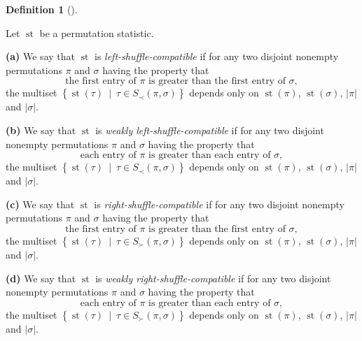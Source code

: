 \documentclass[numbers=enddot,12pt,final,onecolumn,notitlepage]{scrartcl}%
\theoremstyle{definition}
\newtheorem{defi}[theo]{Definition}
\newenvironment{definition}[1][]
{\begin{defi}[#1]\begin{leftbar}}
{\end{leftbar}\end{defi}}
\begin{document}
\begin{definition}
Let $\operatorname*{st}$ be a permutation statistic.

\textbf{(a)} We say that $\operatorname*{st}$ is
\textit{left-shuffle-compatible} if for any two disjoint nonempty permutations
$\pi$ and $\sigma$ having the property that%
\begin{equation}
\text{the first entry of }\pi\text{ is greater than the first entry of }%
\sigma, \label{eq.def.dendri.dsc.ass}%
\end{equation}
the multiset $\left\{  \operatorname*{st}\left(  \tau\right)  \ \mid\ \tau\in
S_{\prec}\left(  \pi,\sigma\right)  \right\}  $ depends only on
$\operatorname*{st}\left(  \pi\right)  $, $\operatorname*{st}\left(
\sigma\right)  $, $\left\vert \pi\right\vert $ and $\left\vert \sigma
\right\vert $.

\textbf{(b)} We say that $\operatorname*{st}$ is \textit{weakly
left-shuffle-compatible} if for any two disjoint nonempty permutations $\pi$
and $\sigma$ having the property that%
\begin{equation}
\text{each entry of }\pi\text{ is greater than each entry of }\sigma,
\label{eq.def.dendri.dsc.weak-ass}%
\end{equation}
the multiset $\left\{  \operatorname*{st}\left(  \tau\right)  \ \mid\ \tau\in
S_{\prec}\left(  \pi,\sigma\right)  \right\}  $ depends only on
$\operatorname*{st}\left(  \pi\right)  $, $\operatorname*{st}\left(
\sigma\right)  $, $\left\vert \pi\right\vert $ and $\left\vert \sigma
\right\vert $.

\textbf{(c)} We say that $\operatorname*{st}$ is
\textit{right-shuffle-compatible} if for any two disjoint nonempty
permutations $\pi$ and $\sigma$ having the property that%
\[
\text{the first entry of }\pi\text{ is greater than the first entry of }%
\sigma,
\]
the multiset $\left\{  \operatorname*{st}\left(  \tau\right)  \ \mid\ \tau\in
S_{\succ}\left(  \pi,\sigma\right)  \right\}  $ depends only on
$\operatorname*{st}\left(  \pi\right)  $, $\operatorname*{st}\left(
\sigma\right)  $, $\left\vert \pi\right\vert $ and $\left\vert \sigma
\right\vert $.

\textbf{(d)} We say that $\operatorname*{st}$ is \textit{weakly
right-shuffle-compatible} if for any two disjoint nonempty permutations $\pi$
and $\sigma$ having the property that%
\[
\text{each entry of }\pi\text{ is greater than each entry of }\sigma,
\]
the multiset $\left\{  \operatorname*{st}\left(  \tau\right)  \ \mid\ \tau\in
S_{\succ}\left(  \pi,\sigma\right)  \right\}  $ depends only on
$\operatorname*{st}\left(  \pi\right)  $, $\operatorname*{st}\left(
\sigma\right)  $, $\left\vert \pi\right\vert $ and $\left\vert \sigma
\right\vert $.
\end{definition}
\end{document}
